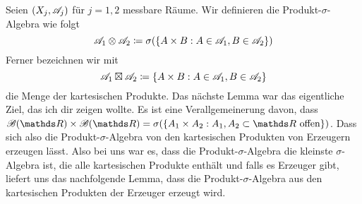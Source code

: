 \documentclass{scrartcl}
\begin{document}
    Seien $(X_j,\mathscr{A}_j)$ für $j=1,2$ messbare Räume. Wir definieren die Produkt-$\sigma$-Algebra wie folgt
    \[
    \mathscr{A}_1\otimes \mathscr{A}_2 \coloneqq \sigma(\{A\times B : A\in \mathscr{A}_1, B\in \mathscr{A}_2 \})   
    \] Ferner bezeichnen wir mit 
    \[
    \mathscr{A}_1 \boxtimes \mathscr{A}_2 \coloneqq \{A\times B : A\in \mathscr{A}_1, B\in \mathscr{A}_2\}    
    \]
    die Menge der kartesischen Produkte. Das nächste Lemma war das eigentliche Ziel, das ich dir zeigen wollte. Es ist eine Verallgemeinerung davon, dass $\cali{B}(\R)\times \cali{B}(\R) = \sigma(\{A_1\times A_2 : A_1,A_2\subset \R \ \text{offen}\})$. 
    Dass sich also die Produkt-$\sigma$-Algebra von den kartesischen Produkten von Erzeugern erzeugen lässt. Also bei uns war es, dass die Produkt-$\sigma$-Algebra die kleinste $\sigma$-Algebra ist, die 
    alle kartesischen Produkte enthält und falls es Erzeuger gibt, liefert uns das nachfolgende Lemma, dass die Produkt-$\sigma$-Algebra aus den kartesischen Produkten der Erzeuger erzeugt wird.
\end{document}
